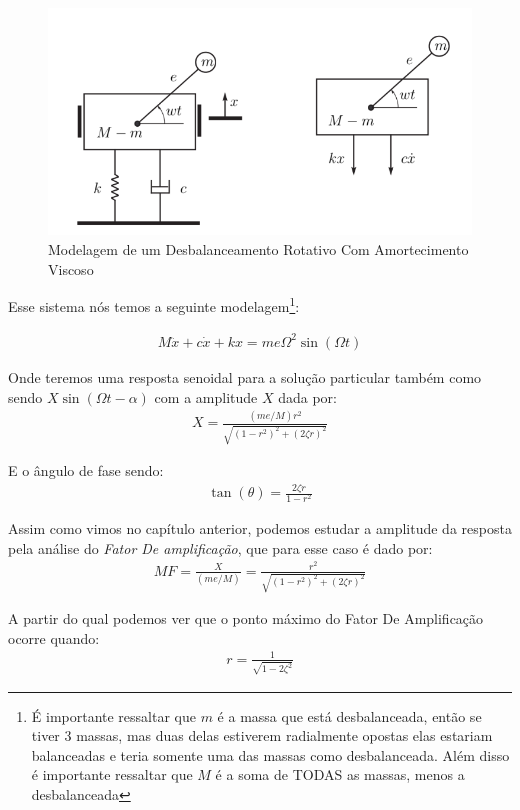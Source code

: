 \documentclass{article}
\begin{document}
            \begin{figure}[h]
                \centering
                \includegraphics[width=.5\textwidth]{imgs/desb_rotativo.png}
                \caption{Modelagem de um Desbalanceamento Rotativo Com Amortecimento Viscoso}
            \end{figure}

            Esse sistema nós temos a seguinte modelagem\footnote{É importante ressaltar que $m$ é a massa que está desbalanceada, então se tiver 3 massas, mas duas delas estiverem radialmente opostas
            elas estariam balanceadas e teria somente uma das massas como desbalanceada. Além disso é importante ressaltar que $M$ é a soma de TODAS as massas, menos a desbalanceada}:

            \begin{align}
                M\ddot x + c \dot x + kx = me\Omega^2 \sin(\Omega t)
            \end{align}

            Onde teremos uma resposta senoidal para a solução particular também como sendo $X \sin{(\Omega t - \alpha)}$ com a amplitude $X$ dada por:
            \begin{align}
                X = \frac{(me/M) r^2}{\sqrt{(1-r^2)^2 + (2\zeta r)^2}}
            \end{align}

            E o ângulo de fase sendo:
            \begin{align}
                \tan{(\theta)} = \frac{2\zeta r}{ 1 - r^2}
            \end{align}

            Assim como vimos no capítulo anterior, podemos estudar a amplitude da resposta pela análise do \emph{Fator De amplificação}, que para esse caso é dado por:
            \begin{align}
                MF = \frac{X}{(me/M)} = \frac{r^2}{\sqrt{(1-r^2)^2 + (2\zeta r )^2}}
            \end{align}

            A partir do qual podemos ver que o ponto máximo do Fator De Amplificação ocorre quando:
            \begin{align}
                r = \frac{1}{\sqrt{1 - 2\zeta^2}}
            \end{align}
            \newpage
\end{document}
